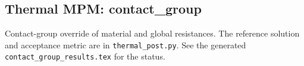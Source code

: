 \subsection{Thermal MPM: contact\_group}
Contact-group override of material and global resistances. The reference solution and acceptance metric are in \texttt{thermal\_post.py}. See the generated \texttt{contact\_group\_results.tex} for the status.
